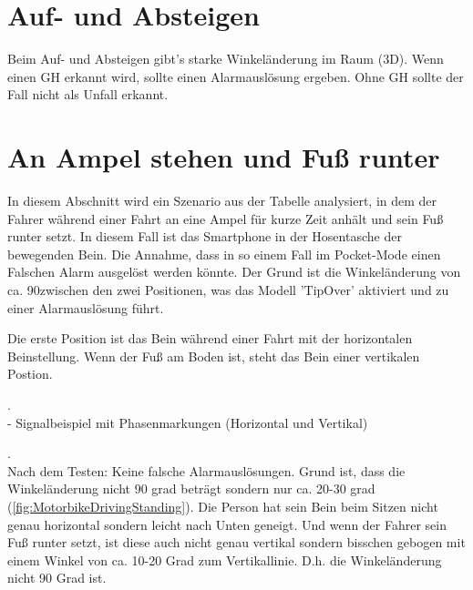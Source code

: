 \section{Auf- und Absteigen} \label{sec:AufAbsteigen} %

Beim Auf- und Absteigen gibt's starke Winkeländerung im Raum (3D). Wenn einen GH erkannt wird, sollte einen Alarmauslösung ergeben. Ohne GH sollte der Fall nicht als Unfall erkannt.



\section{An Ampel stehen und Fuß runter} \label{sec:AmpelStehen} %
In diesem Abschnitt wird ein Szenario aus der Tabelle analysiert, in dem der Fahrer während einer Fahrt an eine Ampel für kurze Zeit anhält und sein Fuß runter setzt. In diesem Fall ist das Smartphone in der Hosentasche der bewegenden Bein.
Die Annahme, dass in so einem Fall im Pocket-Mode einen Falschen Alarm ausgelöst werden könnte. Der Grund ist die Winkeländerung von ca. 90\degree zwischen den zwei Positionen, was das Modell 'TipOver' aktiviert und zu einer Alarmauslösung führt.

Die erste Position ist das Bein während einer Fahrt mit der horizontalen Beinstellung. Wenn der Fuß am Boden ist, steht das Bein einer vertikalen Postion.

.\\

- Signalbeispiel mit Phasenmarkungen (Horizontal und Vertikal)

.\\


Nach dem Testen: Keine falsche Alarmauslösungen. Grund ist, dass die Winkeländerung nicht 90 grad beträgt sondern nur ca. 20-30 grad (\autoref{fig:MotorbikeDrivingStanding}). Die Person hat sein Bein beim Sitzen nicht genau horizontal sondern leicht nach Unten geneigt. Und wenn der Fahrer sein Fuß runter setzt, ist diese auch nicht genau vertikal sondern bisschen gebogen mit einem Winkel von ca. 10-20 Grad zum Vertikallinie. D.h. die Winkeländerung nicht 90 Grad ist.


